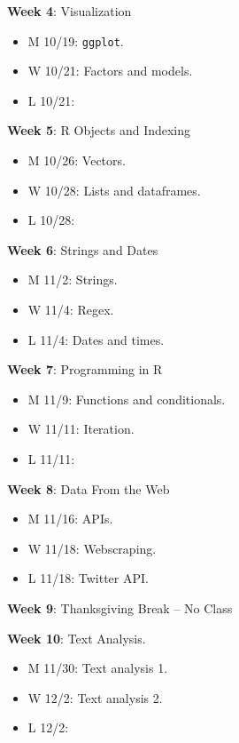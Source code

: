 \documentclass[]{book}
\providecommand{\tightlist}{%
  \setlength{\itemsep}{0pt}\setlength{\parskip}{0pt}}
\begin{document}
\textbf{Week 4}: Visualization

\begin{itemize}
\tightlist
\item
  M 10/19: \texttt{ggplot}.
\item
  W 10/21: Factors and models.
\item
  L 10/21:
\end{itemize}

\textbf{Week 5}: R Objects and Indexing

\begin{itemize}
\tightlist
\item
  M 10/26: Vectors.
\item
  W 10/28: Lists and dataframes.
\item
  L 10/28:
\end{itemize}

\textbf{Week 6}: Strings and Dates

\begin{itemize}
\tightlist
\item
  M 11/2: Strings.
\item
  W 11/4: Regex.
\item
  L 11/4: Dates and times.
\end{itemize}

\textbf{Week 7}: Programming in R

\begin{itemize}
\tightlist
\item
  M 11/9: Functions and conditionals.
\item
  W 11/11: Iteration.
\item
  L 11/11:
\end{itemize}

\textbf{Week 8}: Data From the Web

\begin{itemize}
\tightlist
\item
  M 11/16: APIs.
\item
  W 11/18: Webscraping.
\item
  L 11/18: Twitter API.
\end{itemize}

\textbf{Week 9}: Thanksgiving Break -- No Class

\textbf{Week 10}: Text Analysis.

\begin{itemize}
\tightlist
\item
  M 11/30: Text analysis 1.
\item
  W 12/2: Text analysis 2.
\item
  L 12/2:
\end{itemize}
\end{document}
